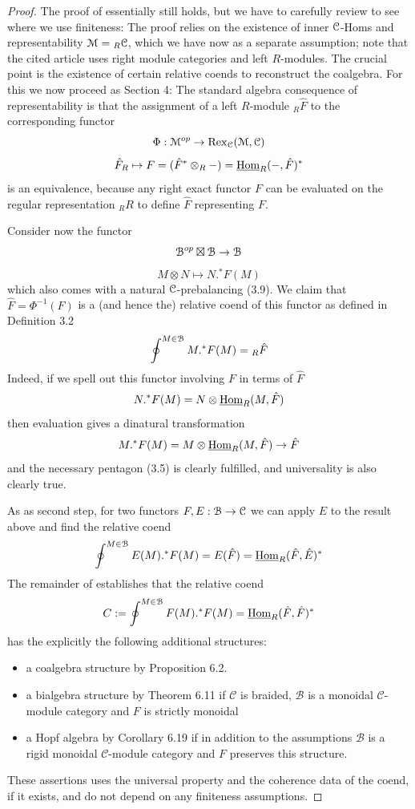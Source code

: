 \documentclass[a4paper, reqno]{amsart}
\theoremstyle{introTheorems}
\newcommand\cB{\mathcal{B}}
\newcommand\cC{\mathcal{C}}
\newcommand\Hom{\textup{Hom}}
\renewcommand{\1}{\mathbbold{1}}
\begin{document}
\begin{proof}
The proof of \cite{LM25} essentially still holds, but we have to carefully review to see where we use finiteness: The proof relies on  the existence of inner $\mathcal{C}$-Homs and representability $\mathcal{M}={_R}\mathcal{C}$, which we have now as a separate assumption; note that the cited article uses right module categories and left $R$-modules. The crucial point is the existence of certain relative coends to reconstruct the coalgebra. For this we now proceed as   \cite{LM25} Section 4: The standard algebra consequence of representability is that the  assignment of a left $R$-module ${_R}\hat{F}$ to the corresponding functor   
$$\Phi:\mathcal{M}^{op}\to \mathrm{Rex}_{\mathcal{C}}(\mathcal{M},\mathcal{C})$$
$$\hat{F}_R \mapsto F=(\hat{F}^*\otimes_R -)
=\underline{\Hom}_R(-,\hat{F})^*$$
is an equivalence, 
because any right exact functor $F$ can be evaluated on the regular representation ${_R}R$ to define $\hat{F}$ representing $F$.

Consider now the functor 
$$\mathcal{B}^{op}\boxtimes \mathcal{B} \to \mathcal{B}$$
$$M\otimes N\mapsto N.{^*}F(M)$$
which also comes with a natural  $\mathcal{C}$-prebalancing \cite{LM25} (3.9).
We claim that $\hat{F}=\Phi^{-1}(F)$ is a (and hence the) relative coend of this functor as defined in \cite{LM25} Definition 3.2
$$\oint^{M\in\mathcal{B}} M.{^*}F(M) = {_R}\hat{F} $$
Indeed, if we spell out this functor involving $F$ in terms of $\hat{F}$
$$N.{^*}F(M)=N\otimes \underline{\Hom}_R(M,\hat{F})$$
then evaluation gives a dinatural transformation 
$$M.{^*}F(M)=M\otimes \underline{\Hom}_R(M,\hat{F}) \to \hat{F}$$
and the necessary pentagon \cite{LM25} (3.5) is clearly fulfilled, and universality is also clearly true.

\bigskip

As as second step, for two functors $F,E:\mathcal{B}\to \mathcal{C}$ we can apply $E$ to the result above and find the relative coend 
$$\oint^{M\in\catB} E(M).{^*}F(M) = 
E(\hat{F})=  \underline{\Hom}_R(\hat{F},\hat{E})^*$$
The remainder of \cite{LM25} establishes that the relative coend 
$$C:=\oint^{M\in\catB} F(M).{^*}F(M) = 
 \underline{\Hom}_R(\hat{F},\hat{F})^*$$
has the explicitly the following additional structures:
\begin{itemize}
\item a coalgebra structure by \cite{LM25} Proposition 6.2.
\item a bialgebra structure by \cite{LM25} Theorem 6.11 if $\cC$ is braided, $\cB$ is a monoidal $\cC$-module category and $F$ is strictly monoidal
\item a Hopf algebra by \cite{LM25} Corollary 6.19 if in addition to the assumptions $\cB$ is a rigid monoidal $\cC$-module category  and $F$ preserves this structure.
\end{itemize}
These assertions uses the universal property and the coherence data of the coend, if it exists, and do not depend on any finiteness assumptions. 

\end{proof}
\end{document}
